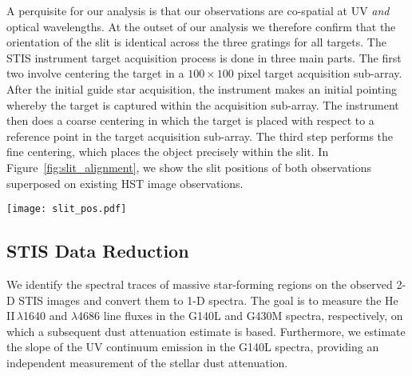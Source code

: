 \documentclass[linenumbers]{aastex63}
\begin{document}
A perquisite for our analysis is that our observations are co-spatial at UV {\it and} optical wavelengths. At the outset of our analysis we therefore confirm that the orientation of the slit is identical across the three gratings for all targets. The STIS instrument target acquisition process is done in three main parts. The first two involve centering the target in a $100 \times 100$ pixel target acquisition sub-array. After the initial guide star acquisition, the instrument makes an initial pointing whereby the target is captured within the acquisition sub-array. The instrument then does a coarse centering in which the target is placed with respect to a reference point in the target acquisition sub-array. The third step performs the fine centering, which places the object precisely within the slit.
In Figure~\ref{fig:slit_alignment}, we show the slit positions of both observations superposed on existing HST image observations.
%
\begin{figure*}[h!]
    \centering
    \texttt{[image: slit\_pos.pdf]}
    \caption{Observed galaxies with STIS slit positions overlaid. For each galaxy we show HST composite images taken from the archive using the software \textsc{multicolorfits}\footnote{\url{https://github.com/pjcigan/multicolorfits}} and include the aligned STIS slits with a solid green (resp. dashed blue) line for the G140L (resp. G430M) grating. The zoom-in panels show the identified He\,II emitters.} 
    \label{fig:slit_alignment}
\end{figure*}
%

\subsection{STIS Data Reduction}\label{sec:stis_data_reduction}
We identify the spectral traces of massive star-forming regions on the observed 2-D STIS images and convert them to 1-D spectra. The goal is to measure the He\,II\,$\lambda$1640 and $\lambda$4686 line fluxes in the G140L and G430M spectra, respectively, on which a subsequent dust attenuation estimate is based. Furthermore, we estimate the slope of the UV continuum emission in the G140L spectra, providing an independent measurement of the stellar dust attenuation. 
\end{document}

